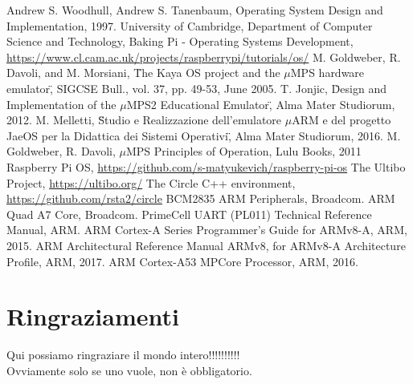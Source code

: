 \documentclass[12pt,a4paper,openright,twoside]{report}
\begin{document}
\begin{thebibliography}{90}             %
 Andrew S. Woodhull, Andrew S. Tanenbaum, 
                Operating System Design and Implementation, 1997.
 University of Cambridge, Department of Computer Science and Technology,
                    Baking Pi - Operating Systems Development,
                    \url{https://www.cl.cam.ac.uk/projects/raspberrypi/tutorials/os/}
 M. Goldweber, R. Davoli, and M. Morsiani,
                        \"The Kaya OS project and the $\mu$MPS hardware emulator\",
                          SIGCSE Bull., vol. 37, pp. 49-53, June 2005.
 T. Jonjic,
                    \"Design and Implementation of the $\mu$MPS2 Educational Emulator\",
                    Alma Mater Studiorum, 2012.
 M. Melletti,
                    \"Studio e Realizzazione dell'emulatore $\mu$ARM e del progetto
                    JaeOS per la Didattica dei Sistemi Operativi\",
                    Alma Mater Studiorum, 2016.
 M. Goldweber, R. Davoli, $\mu$MPS Principles of Operation, Lulu Books, 2011
 Raspberry Pi OS, \url{https://github.com/s-matyukevich/raspberry-pi-os}
 The Ultibo Project, \url{https://ultibo.org/}
 The Circle C++ environment, \url{https://github.com/rsta2/circle}
 BCM2835 ARM Peripherals, Broadcom.
 ARM Quad A7 Core, Broadcom.
 PrimeCell UART (PL011) Technical Reference Manual, ARM.
 ARM Cortex-A Series Programmer's Guide for ARMv8-A, ARM, 2015.
 ARM Architectural Reference Manual ARMv8, for ARMv8-A Architecture Profile, ARM, 2017.
 ARM Cortex-A53 MPCore Processor, ARM, 2016.
\end{thebibliography}
\clearpage{\pagestyle{empty}\cleardoublepage}
\chapter*{Ringraziamenti}
\thispagestyle{empty}
Qui possiamo ringraziare il mondo intero!!!!!!!!!!\\
Ovviamente solo se uno vuole, non \`e obbligatorio.
\end{document}
